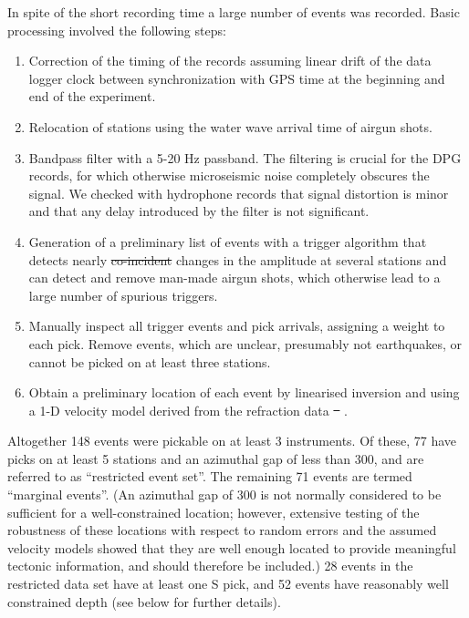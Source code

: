 \documentclass[jgrga]{agu2001} %
\newlength{\tw}
\providecommand{\DIFadd}[1]{{\protect\color{blue}\uwave{#1}}} %
\providecommand{\DIFdel}[1]{{\protect\color{red}\sout{#1}}}                      %
\providecommand{\DIFaddbegin}{} %
\providecommand{\DIFaddend}{} %
\providecommand{\DIFdelbegin}{} %
\providecommand{\DIFdelend}{} %
\begin{document}
\begin{article}
 In spite of the short recording time a large number of events was
recorded. Basic processing involved the following steps:
\begin{enumerate}
\item 
Correction of the timing of the records assuming  linear drift
of the data logger clock between synchronization with GPS time at the
beginning and end of the experiment.  
\item Relocation of stations using the water wave arrival time of
airgun shots.
\item Bandpass filter with a 5-20 Hz passband.  The
filtering is crucial for the DPG records, for which otherwise
microseismic noise completely obscures the signal. We checked with
hydrophone records that signal distortion is minor and that any delay introduced by
the filter is not significant.  
\item Generation of  a preliminary list of events
with a trigger algorithm that  detects nearly
\DIFdelbegin \DIFdel{co-incident }\DIFdelend \DIFaddbegin \DIFadd{coincident }\DIFaddend changes in the amplitude at several stations and can
detect and remove man-made airgun shots, which otherwise lead to a
large number of spurious triggers.  
\item Manually inspect all trigger events and pick arrivals, assigning
a weight to each pick. Remove
events, which are unclear, presumably not earthquakes, or cannot be
picked on at least three stations. 
\item Obtain a preliminary location of each event by linearised
inversion and using a 1-D velocity model derived from the refraction
data \DIFdelbegin \DIFdel{\mbox{%
\citep{planert-con03}}%
}\DIFdelend \DIFaddbegin \DIFadd{\mbox{%
\citetext{see \citealp{planert-con03}, and section~\ref{sec:refraction} below}}%
}\DIFaddend .
\end{enumerate}
Altogether 148 events were pickable on at least 3 instruments. Of
these, 77 have picks on at least 5 stations and an azimuthal gap of
less than 300\dg, and are referred to as ``restricted event set''. The
remaining 71 events are termed ``marginal events''. (An azimuthal gap
of 300{\dg} is not normally considered to be sufficient for a
well-constrained location; however, extensive testing of the
robustness of these locations with respect to random errors and the
assumed velocity models showed that they are well enough located to
provide meaningful tectonic information, and should therefore be included.)
28 events in the
restricted data set
 have at least one S pick, and 52 events have reasonably well
constrained depth (see below for further details). 


\end{article}
\end{document}
